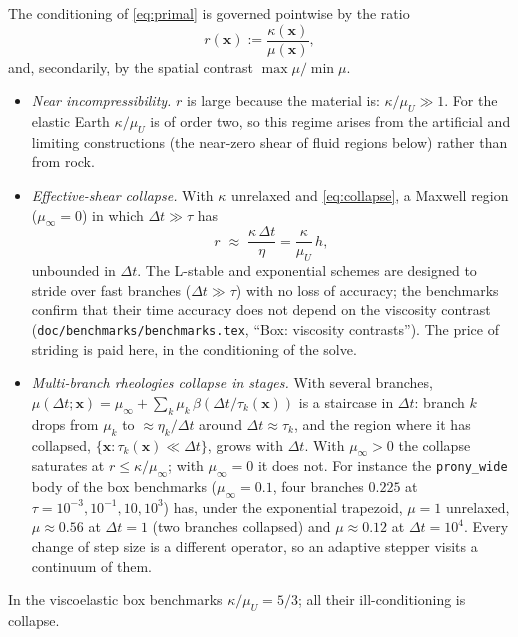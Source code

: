 \documentclass[11pt]{article}
\numberwithin{equation}{section}
\theoremstyle{remark}
\newcommand{\vx}{\mathbf{x}}
\newcommand{\code}[1]{\texttt{#1}}
\begin{document}
The conditioning of \eqref{eq:primal} is governed pointwise by the ratio
\begin{equation}
  r(\vx) := \frac{\kappa(\vx)}{\mu(\vx)},
\end{equation}
and, secondarily, by the spatial contrast $\max\mu/\min\mu$.
\begin{itemize}
\item \emph{Near incompressibility.} $r$ is large because the material
  is: $\kappa/\mu_U \gg 1$. For the elastic Earth $\kappa/\mu_U$ is of
  order two, so this regime arises from the artificial and limiting
  constructions (the near-zero shear of fluid regions below) rather than
  from rock.
\item \emph{Effective-shear collapse.} With $\kappa$ unrelaxed and
  \eqref{eq:collapse}, a Maxwell region ($\mu_\infty = 0$) in which
  $\Delta t\gg\tau$ has
  \begin{equation}
    r \;\approx\; \frac{\kappa\,\Delta t}{\eta}
      = \frac{\kappa}{\mu_U}\, h,
  \end{equation}
  unbounded in $\Delta t$. The L-stable and exponential schemes are
  designed to stride over fast branches ($\Delta t\gg\tau$) with no loss of
  accuracy; the benchmarks confirm that their time accuracy does not
  depend on the viscosity contrast (\code{doc/benchmarks/benchmarks.tex}, ``Box:
  viscosity contrasts''). The price of striding is paid here, in the
  conditioning of the solve.
\item \emph{Multi-branch rheologies collapse in stages.} With several
  branches, $\mu(\Delta t;\vx) = \mu_\infty + \sum_k \mu_k\,
  \beta(\Delta t/\tau_k(\vx))$ is a staircase in $\Delta t$: branch $k$
  drops from $\mu_k$ to $\approx\eta_k/\Delta t$ around $\Delta t\approx
  \tau_k$, and the region where it has collapsed, $\{\vx :
  \tau_k(\vx)\ll\Delta t\}$, grows with $\Delta t$. With $\mu_\infty > 0$
  the collapse saturates at $r \le \kappa/\mu_\infty$; with $\mu_\infty =
  0$ it does not. For instance the \code{prony\_wide} body of the box
  benchmarks ($\mu_\infty = 0.1$, four branches $0.225$ at $\tau =
  10^{-3},10^{-1},10,10^{3}$) has, under the exponential trapezoid,
  $\mu = 1$ unrelaxed, $\mu \approx 0.56$ at $\Delta t = 1$ (two branches
  collapsed) and $\mu \approx 0.12$ at $\Delta t = 10^4$. Every change of
  step size is a different operator, so an adaptive stepper visits a
  continuum of them.
\end{itemize}
In the viscoelastic box benchmarks $\kappa/\mu_U = 5/3$; all their
ill-conditioning is collapse.
\end{document}
